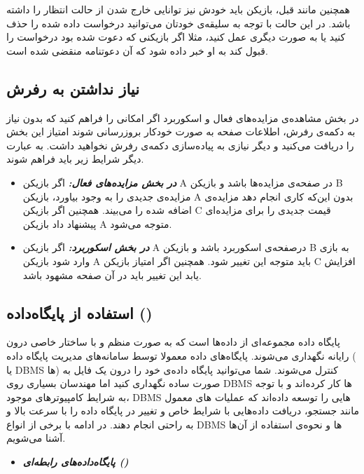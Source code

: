 \documentclass[]{article}
\begin{document}
همچنین مانند قبل، بازیکن باید خودش نیز توانایی خارج شدن از حالت انتظار را داشته باشد. در این حالت با توجه به سلیقه‌ی خودتان می‌توانید درخواست داده شده را حذف کنید یا به صورت دیگری عمل کنید، مثلا اگر بازیکنی که دعوت شده بود درخواست را قبول کند به او خبر داده شود که آن دعوتنامه منقضی شده است.

\subsection*{{\titr نیاز نداشتن به رفرش}}
در بخش مشاهده‌ی مزایده‌های فعال و اسکوربرد اگر امکانی را فراهم کنید که بدون نیاز به دکمه‌ی رفرش، اطلاعات صفحه به صورت خودکار بروزرسانی شوند امتیاز این بخش را دریافت می‌کنید و دیگر نیازی به پیاده‌سازی دکمه‌ی رفرش نخواهید داشت. به عبارت دیگر شرایط زیر باید فراهم شوند.

\begin{itemize}
	\item  \textbf{\emph{در بخش مزایده‌های فعال: }}
	اگر بازیکن A در صفحه‌ی مزایده‌ها باشد و بازیکن B مزایده‌ی جدیدی را به وجود بیاورد، بازیکن A بدون این‌که کاری انجام دهد مزایده‌ی اضافه شده را می‌بیند. همچنین اگر بازیکن C قیمت جدیدی را برای مزایده‌ای پیشنهاد داد بازیکن A متوجه می‌شود.
	\item  \textbf{\emph{در بخش اسکوربرد:}}
	اگر بازیکن A درصفحه‌ی اسکوربرد باشد و بازیکن B به بازی وارد شود بازیکن A باید متوجه این تغییر شود. همچنین اگر امتیاز بازیکن C افزایش یابد این تغییر باید در آن صفحه مشهود باشد.
\end{itemize}

\subsection*{{\titr استفاده از پایگاه‌داده ()}}

پایگاه داده مجموعه‌ای از داده‌ها است که به صورت منظم و با ساختار خاصی درون رایانه نگهداری می‌شوند. پایگاه‌های داده معمولا توسط سامانه‌های مدیریت پایگاه داده ( یا DBMS ها) کنترل می‌شوند. شما می‌توانید پایگاه داده‌ی خود را درون یک فایل به صورت ساده نگهداری کنید اما مهندسان بسیاری روی DBMS ها کار کرده‌اند و با توجه به شرایط کامپیوترهای موجود، DBMS هایی را توسعه داده‌اند که عملیات های معمول مانند جستجو، دریافت داده‌هایی با شرایط خاص و تغییر در پایگاه داده را با سرعت بالا و به راحتی انجام دهند. در ادامه با برخی از انواع DBMS ها و نحوه‌ی استفاده از آن‌ها آشنا می‌شویم.
\\
\begin{itemize}
\item \textbf{\emph{ پایگاه‌داده‌های رابطه‌ای () }}
\end{itemize}
\end{document}
